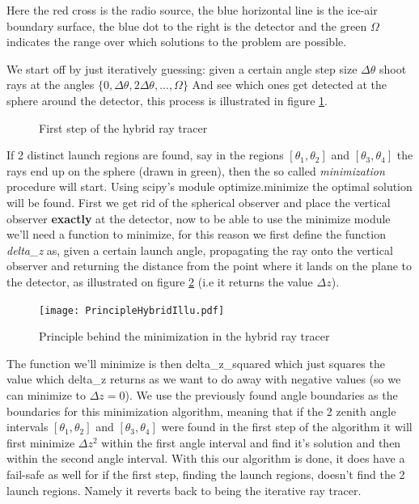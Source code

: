 Here the red cross is the radio source, the blue horizontal line is the ice-air
boundary surface, the blue dot to the right is the detector and the green
$\Omega$ indicates the range over which solutions to the problem are possible.

We start off by just iteratively guessing: given a certain angle step size
$\Delta \theta$ shoot rays at the angles $\{0,\Delta \theta, 2\Delta
\theta,...,\Omega\}$ And see which ones get detected at the sphere around the
detector, this process is illustrated in figure \ref{figure:First step hybrid}.
\begin{figure}
	\centering
	\caption{First step of the hybrid ray tracer}
	\label{figure:First step hybrid}
\end{figure}

If 2 distinct launch regions are found, say in the regions $[\theta_1,\theta_2]$ and $[\theta_3,\theta_4]$ the
rays end up on the sphere (drawn in green), then the so called \textit{minimization}
procedure will start. Using scipy's module optimize.minimize the optimal
solution will be found. First we get rid of the spherical observer and place
the vertical observer \textbf{exactly} at the detector, now to be able to use the
minimize module we'll need a function to minimize, for this reason we first define the
function \textit{delta\_z} as, given a certain launch angle, propagating the ray
onto the vertical observer and returning the
distance from the point where it lands on the plane to the detector, as
illustrated on figure \ref{fig:PrincipleHybridIllu} (i.e it returns the value $\Delta z$).
\begin{figure}
  \centering
  \texttt{[image: PrincipleHybridIllu.pdf]}
  \caption{Principle behind the minimization in the hybrid ray tracer}
  \label{fig:PrincipleHybridIllu}
\end{figure}
The function we'll minimize is then delta\_z\_squared which just squares the
value which delta\_z returns as we want to do away with negative values (so we
can minimize to $\Delta z=0$). We use the previously found angle boundaries as
the boundaries for this minimization algorithm, meaning that if the 2 zenith
angle intervals $[\theta_1,\theta_2]$ and $[\theta_3,\theta_4]$ were found in
the first step of the algorithm it will first minimize $\Delta z^2$ within the
first angle interval and find it's solution and then within the second angle
interval. With this our algorithm is done, it does have a fail-safe as well for
if the first step, finding the launch regions, doesn't find the 2 launch
regions.  Namely it reverts back to being the iterative ray tracer.

